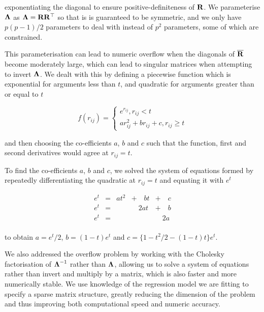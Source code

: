 \noindent exponentiating the diagonal to ensure positive-definiteness of ${\bf R}$. We parameterise ${\boldsymbol \Lambda}$
as ${\boldsymbol \Lambda} = {\bf R} {\bf R}^\top$ so that is is guaranteed to be symmetric, and we only have $p(p-1)/2$ 
parameters to deal with instead of $p^2$ parameters, some of which are constrained. 

This parameterisation can lead to numeric overflow when the diagonals of $\overline{{\bf R}}$ become moderately
large, which can lead to singular matrices when attempting to invert ${\boldsymbol \Lambda}$. We dealt with this by
defining a piecewise function which is exponential for arguments less than $t$, and quadratic for arguments
greater than or equal to $t$

\begin{equation}
f(r_{ij}) =
\begin{cases}
	e^{r_{ij}}, r_{ij} < t                   \\
	a r_{ij}^2 + b r_{ij} + c, r_{ij} \geq t 
\end{cases}
\end{equation}

and then choosing the co-efficients $a$, $b$ and $c$ such that the function, first and second derivatives would
agree at $r_{ij} = t$.

To find the co-efficients $a$, $b$ and $c$, we solved the system of equations formed by repeatedly 
differentiating the quadratic at $r_{ij} =  t$ and equating it with $e^t$

\begin{equation}
\begin{array}{lllll}
	e^t & = & a t^2 & + \quad b t & + \quad c \\
	e^t & = &       & \quad 2a t  & + \quad b \\
	e^t & = &       &             & \quad 2a  \\
\end{array}
\end{equation}

to obtain $a = e^t / 2$, $b = (1 - t) e^t$ and $c = \{1 - t^2/2 - (1 - t) t\} e^t$.

We also addressed the overflow problem by working with the Cholesky factorisation of ${\boldsymbol \Lambda}^{-1}$
rather than ${\boldsymbol \Lambda}$, allowing us to solve a system of equations rather than invert and multiply by a
matrix, which is also faster and more numerically stable. We use knowledge of the regression  model we are
fitting to specify a sparse matrix structure, greatly reducing the dimension of   the problem and thus
improving both computational speed and numeric accuracy.

